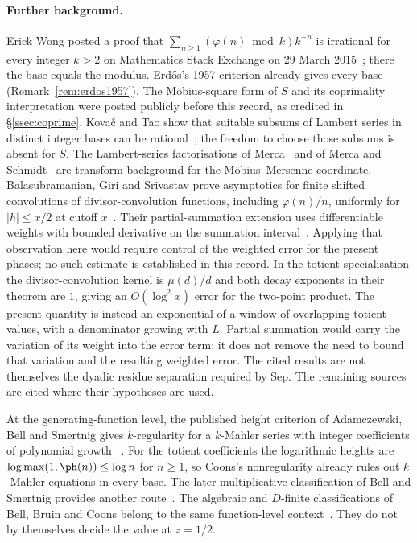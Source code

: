 \paragraph{Further background.}
Erick Wong posted a proof that
$\sum_{n\ge1}(\varphi(n)\bmod k)k^{-n}$ is irrational for every integer $k>2$
on Mathematics Stack Exchange on 29 March 2015~\cite{wong2015}; there the base
equals the modulus. Erd\H{o}s's 1957 criterion already gives every base
(Remark~\ref{rem:erdos1957}).  The M\"obius-square form of $S$ and its coprimality
interpretation were posted publicly before this record, as credited in
\S\ref{ssec:coprime}.  Kova\v{c} and Tao show that suitable subsums of Lambert
series in distinct integer bases can be rational~\cite[Theorem~2.3]{kovac-tao};
the freedom to choose those subsums is absent for $S$.  The Lambert-series
factorisations of Merca~\cite[Theorem~1.2]{merca2017} and of Merca and
Schmidt~\cite{merca-schmidt} are transform background for the
M\"obius--Mersenne coordinate.  Balasubramanian, Giri and Srivastav prove
asymptotics for finite shifted convolutions of divisor-convolution
functions, including $\varphi(n)/n$, uniformly for $|h|\le x/2$ at
cutoff $x$~\cite[Theorem~2.2]{bgs2016}. Their partial-summation extension
uses differentiable weights with bounded derivative on the summation
interval~\cite[Rem.~2.9]{bgs2016}.
Applying that observation here would require control of the weighted
error for the present phases; no such estimate is established in this
record.
In the totient specialisation the divisor-convolution kernel is
$\mu(d)/d$ and both decay exponents in their theorem are $1$, giving
an $O(\log^2x)$ error for the two-point product. The present quantity
is instead an exponential of a window of overlapping totient values,
with a denominator growing with $L$. Partial summation would carry
the variation of its weight into the error term; it does not remove
the need to bound that variation and the resulting weighted error. The cited results are not themselves the dyadic residue
separation required by $\mathrm{Sep}$.  The remaining sources are cited where their hypotheses are
used.

At the generating-function level, the published height criterion of
Adamczewski, Bell and Smertnig gives $k$-regularity for a $k$-Mahler
series with integer coefficients of polynomial growth
~\cite[Thm.~1.2(b), p.~2528]{adamczewski-bell-smertnig2023}.
For the totient coefficients the logarithmic heights are
$\log\max(1,\ph(n))\le\log n$ for $n\ge1$, so Coons's nonregularity
already rules out $k$-Mahler equations in every base. The later
multiplicative classification of Bell and Smertnig provides another
route~\cite[Thm.~1.3 and p.~3]{bell-smertnig2026}.
The algebraic and $D$-finite classifications of Bell, Bruin and Coons
belong to the same function-level context~\cite[Thms.~1.5--1.6]{bell-bruin-coons}.
They do not by themselves decide the value at $z=1/2$.

